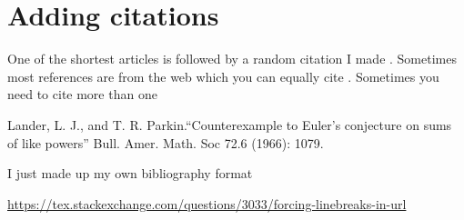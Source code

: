 \documentclass[12pt]{article}
\begin{document}

\section{Adding citations}
One of the shortest articles \cite{bib_entry1} is followed by a random citation I made \cite{whatever_name_you_want}. Sometimes most references are from the web which you can equally cite \cite{cool_paper_from_web}. Sometimes you need to cite more than one \cite{bib_entry1,whatever_name_you_want,cool_paper_from_web}



\begin{thebibliography}{99} %
Lander, L. J., and T. R. Parkin.``Counterexample to Euler’s conjecture on sums of like powers'' Bull. Amer. Math. Soc 72.6 (1966): 1079.

I just made up my own bibliography format

\url{https://tex.stackexchange.com/questions/3033/forcing-linebreaks-in-url}

\end{thebibliography}
\end{document}
